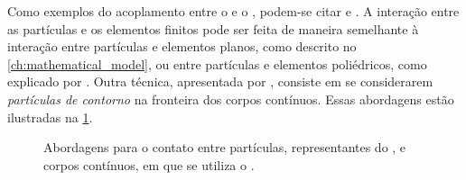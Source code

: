 Como exemplos do acoplamento entre o \DEM{} e o \FEM{}, podem-se citar  e . A interação entre as partículas e os elementos finitos pode ser feita de maneira semelhante à interação entre partículas e elementos planos, como descrito no \cref{ch:mathematical_model}, ou entre partículas e elementos poliédricos, como explicado por . Outra técnica, apresentada por , consiste em se considerarem \textit{partículas de contorno} na fronteira dos corpos contínuos. Essas abordagens estão ilustradas na \cref{fig:method_coupling:images}.

\begin{figure}[h]
	\caption{Abordagens para o contato entre partículas, representantes do \DEM{}, e corpos contínuos, em que se utiliza o \FEM{}.}
	\centering
	\captionsetup[subfloat]{labelfont=bf}
	\label{fig:method_coupling:images}
\end{figure}

